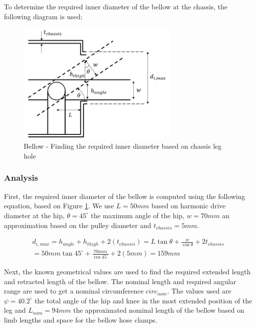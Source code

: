 To determine the required inner diameter of the bellow at the chassis, the following diagram is used:

\begin{figure}
    \centering
    \includegraphics[width=0.7\textwidth]{4_Analysis/img/Bellow/bellowHole.JPG}
    \caption{Bellow - Finding the required inner diameter based on chassis leg hole}
    \label{fig:bellow_hole}
\end{figure}


\subsubsection{Analysis}
First, the required inner diameter of the bellow is computed using the following equation, based on Figure \ref{fig:bellow_hole}. We use $L=50mm$ based on harmonic drive diameter at the hip, $\theta=45^\circ$ the maximum angle of the hip, $w=70mm$ an approximation based on the pulley diameter and $t_{chassis}=5mm$.

\begin{equation}
    \begin{split}
       d_{i,max}=h_{angle}+h_{thigh}+2(t_{chassis})=L\tan{\theta}+\frac{w}{\cos{\theta}}+2t_{chassis}
       \\
       =50mm\tan{45^\circ}+\frac{70mm}{\cos{45^\circ}}+2(5mm)=159 mm \label{eq:bellow_hol} 
    \end{split}
\end{equation}

Next, the known geometrical values are used to find the required extended length and retracted length of the bellow. The nominal length and required angular range are used to get a nominal circumference $circ_{nom}$. The values used are $\psi=40.2^\circ$ the total angle of the hip and knee in the most extended position of the leg and $L_{nom}=94mm$ the approximated nominal length of the bellow based on limb lengths and space for the bellow hose clamps.

